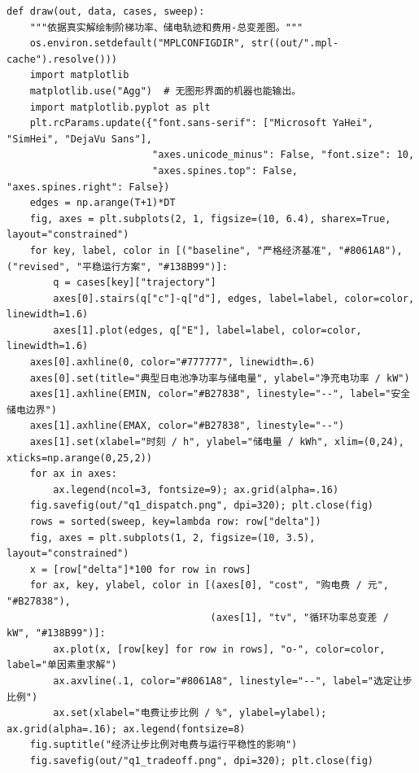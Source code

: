 \documentclass[withoutpreface,bwprint]{cumcmthesis}
\begin{document}
\begin{appendices}
\begin{lstlisting}
def draw(out, data, cases, sweep):
    """依据真实解绘制阶梯功率、储电轨迹和费用-总变差图。"""
    os.environ.setdefault("MPLCONFIGDIR", str((out/".mpl-cache").resolve()))
    import matplotlib
    matplotlib.use("Agg")  # 无图形界面的机器也能输出。
    import matplotlib.pyplot as plt
    plt.rcParams.update({"font.sans-serif": ["Microsoft YaHei", "SimHei", "DejaVu Sans"],
                         "axes.unicode_minus": False, "font.size": 10,
                         "axes.spines.top": False, "axes.spines.right": False})
    edges = np.arange(T+1)*DT
    fig, axes = plt.subplots(2, 1, figsize=(10, 6.4), sharex=True, layout="constrained")
    for key, label, color in [("baseline", "严格经济基准", "#8061A8"), ("revised", "平稳运行方案", "#138B99")]:
        q = cases[key]["trajectory"]
        axes[0].stairs(q["c"]-q["d"], edges, label=label, color=color, linewidth=1.6)
        axes[1].plot(edges, q["E"], label=label, color=color, linewidth=1.6)
    axes[0].axhline(0, color="#777777", linewidth=.6)
    axes[0].set(title="典型日电池净功率与储电量", ylabel="净充电功率 / kW")
    axes[1].axhline(EMIN, color="#B27838", linestyle="--", label="安全储电边界")
    axes[1].axhline(EMAX, color="#B27838", linestyle="--")
    axes[1].set(xlabel="时刻 / h", ylabel="储电量 / kWh", xlim=(0,24), xticks=np.arange(0,25,2))
    for ax in axes:
        ax.legend(ncol=3, fontsize=9); ax.grid(alpha=.16)
    fig.savefig(out/"q1_dispatch.png", dpi=320); plt.close(fig)
    rows = sorted(sweep, key=lambda row: row["delta"])
    fig, axes = plt.subplots(1, 2, figsize=(10, 3.5), layout="constrained")
    x = [row["delta"]*100 for row in rows]
    for ax, key, ylabel, color in [(axes[0], "cost", "购电费 / 元", "#B27838"),
                                   (axes[1], "tv", "循环功率总变差 / kW", "#138B99")]:
        ax.plot(x, [row[key] for row in rows], "o-", color=color, label="单因素重求解")
        ax.axvline(.1, color="#8061A8", linestyle="--", label="选定让步比例")
        ax.set(xlabel="电费让步比例 / %", ylabel=ylabel); ax.grid(alpha=.16); ax.legend(fontsize=8)
    fig.suptitle("经济让步比例对电费与运行平稳性的影响")
    fig.savefig(out/"q1_tradeoff.png", dpi=320); plt.close(fig)



\end{lstlisting}
\end{appendices}
\end{document}
